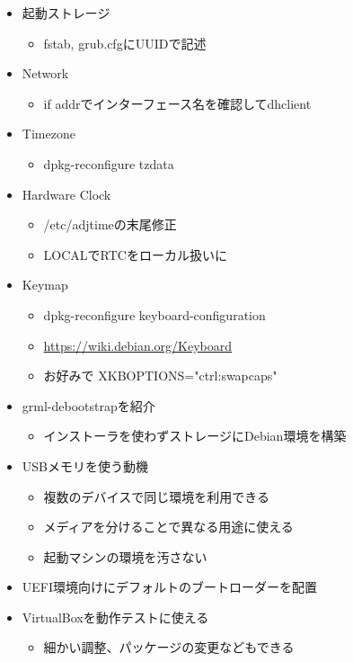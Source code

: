\documentclass[mingoth,a4paper]{jsarticle}
\begin{document}
  \begin{itemize}
  \item 起動ストレージ
    \begin{itemize}
    \item fstab, grub.cfgにUUIDで記述
    \end{itemize}
  \item Network
    \begin{itemize}
    \item if addrでインターフェース名を確認してdhclient
    \end{itemize}
  \item Timezone
    \begin{itemize}
    \item dpkg-reconfigure tzdata
    \end{itemize}
  \item Hardware Clock
    \begin{itemize}
    \item /etc/adjtimeの末尾修正
    \item LOCALでRTCをローカル扱いに
    \end{itemize}
  \item Keymap
    \begin{itemize}
    \item dpkg-reconfigure keyboard-configuration
    \item \url{https://wiki.debian.org/Keyboard}
    \item お好みで XKBOPTIONS="ctrl:swapcaps"
    \end{itemize}
  \end{itemize}

  \begin{itemize}
  \item grml-debootstrapを紹介
    \begin{itemize}
    \item インストーラを使わずストレージにDebian環境を構築
    \end{itemize}
  \item USBメモリを使う動機
    \begin{itemize}
    \item 複数のデバイスで同じ環境を利用できる
    \item メディアを分けることで異なる用途に使える
    \item 起動マシンの環境を汚さない
    \end{itemize}
  \item UEFI環境向けにデフォルトのブートローダーを配置
  \item VirtualBoxを動作テストに使える
    \begin{itemize}
    \item 細かい調整、パッケージの変更などもできる
    \end{itemize}
  \end{itemize}
\end{document}
